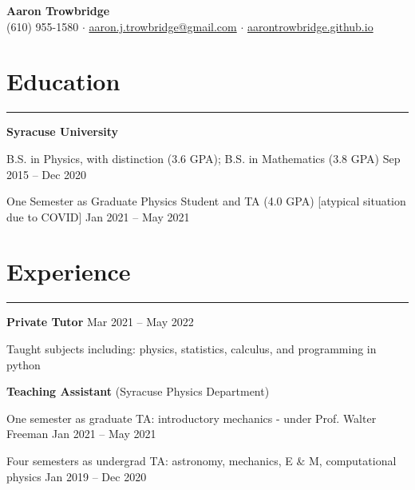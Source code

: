 \documentclass[9pt]{extarticle}
\newcommand{\myline}{\rule[\baselineskip]{\linewidth}{1pt}}
\begin{document}
\begin{center}
\Huge
\textbf{Aaron Trowbridge}\\

\normalsize
(610) 955-1580 $\cdot$ \href{mailto:aaron.j.trowbridge@gmail.com}{aaron.j.trowbridge@gmail.com} $\cdot$ \href{https://aarontrowbridge.github.io/}{aarontrowbridge.github.io} \\

\end{center}


\section{Education}

\myline


\large\textbf{Syracuse University} 

\normalsize
\begin{compactitem}
\setlength\itemsep{0em}
\item B.S. in Physics, with distinction (3.6 GPA); B.S. in Mathematics (3.8 GPA) \hfill \small Sep 2015 -- Dec 2020 
\item One Semester as Graduate Physics Student and TA (4.0 GPA) [atypical situation due to COVID] \hfill \small Jan 2021 -- May 2021

\end{compactitem}


\section{Experience}

\myline

\large\textbf{Private Tutor} \hfill \small Mar 2021 -- May 2022 
\normalsize

\begin{compactitem}
\item Taught subjects including: physics, statistics, calculus, and programming in python
\end{compactitem}

\vspace{2.5pt}
\large\textbf{Teaching Assistant} \normalsize (Syracuse Physics Department)
\normalsize

\begin{compactitem}
\item One semester as graduate TA: introductory mechanics - under Prof. Walter Freeman \hfill \small Jan 2021 -- May 2021
\item Four semesters as undergrad TA: astronomy, mechanics, E $\&$ M, computational physics  \hfill \small Jan 2019 -- Dec 2020
\end{compactitem}
\end{document}
